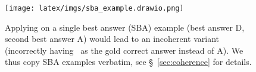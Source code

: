 \begin{figure}[t!]
\centering
\texttt{[image: latex/imgs/sba\_example.drawio.png]}
\caption{Applying \wicds on a single best answer (SBA) example (best answer D, second best answer A) would lead to an incoherent \wicds variant (incorrectly having \nota ~as the gold correct answer instead of A). We thus copy SBA examples verbatim, see \S~\ref{sec:coherence} for details.  }
\label{fig:sba-vs-sca}
\end{figure} 